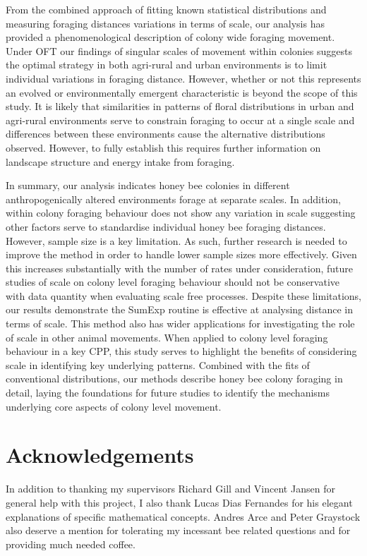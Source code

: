 \documentclass[11pt,usenames,dvipsnames]{article}
\begin{document}
\begin{linenumbers}
From the combined approach of fitting known statistical distributions and measuring foraging distances variations in terms of scale, our analysis has provided a phenomenological description of colony wide foraging movement. Under OFT our findings of singular scales of movement within colonies suggests the optimal strategy in both agri-rural and urban environments is to limit individual variations in foraging distance. However, whether or not this represents an evolved or environmentally emergent characteristic is beyond the scope of this study. It is likely that similarities in patterns of floral distributions in urban and agri-rural environments serve to constrain foraging to occur at a single scale and differences between these environments cause the alternative distributions observed. However, to fully establish this requires further information on landscape structure and energy intake from foraging. 

In summary, our analysis indicates honey bee colonies in different anthropogenically altered environments forage at separate scales. In addition, within colony foraging behaviour does not show any variation in scale suggesting other factors serve to standardise individual honey bee foraging distances. However, sample size is a key limitation. As such, further research is needed to improve the method in order to handle lower sample sizes more effectively. Given this increases substantially with the number of rates under consideration, future studies of scale on colony level foraging behaviour should not be conservative with data quantity when evaluating scale free processes. Despite these limitations, our results demonstrate the SumExp routine is effective at analysing distance in terms of scale. This method also has wider applications for investigating the role of scale in other animal movements. When applied to colony level foraging behaviour in a key CPP, this study serves to highlight the benefits of considering scale in identifying key underlying patterns. Combined with the fits of conventional distributions, our methods describe honey bee colony foraging in detail, laying the foundations for future studies to identify the mechanisms underlying core aspects of colony level movement.
\end{linenumbers}

\section{Acknowledgements}

In addition to thanking my supervisors Richard Gill and Vincent Jansen for general help with this project, I also thank Lucas Dias Fernandes for his elegant explanations of specific mathematical concepts. Andres Arce and Peter Graystock also deserve a mention for tolerating my incessant bee related questions and for providing much needed coffee.




\end{document}
